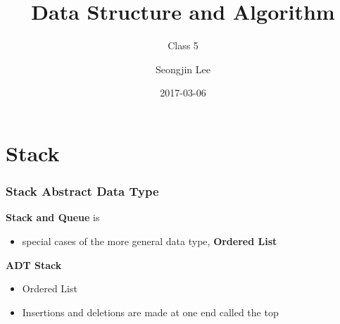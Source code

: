 \documentclass[newPxFont,sthlmFooter,nooffset]{beamer}
\title{Data Structure and Algorithm}
\subtitle{Class 5}
\author[SJL]{Seongjin Lee}
\institute{\href{mailto:insight@gnu.ac.kr}{insight@gnu.ac.kr}\\\url{http://resourceful.github.io}\\Systems Research Lab.\\GNU}
\date{2017-03-06}
\begin{document}
\frame[plain,t]{\titlepage} 



\section{Stack} 
\begin{frame}[t]
  \frametitle{Stack Abstract Data Type}
\textbf{Stack and Queue} is
\begin{itemize}
\item special cases of the more general data type, \textbf{Ordered List}
\end{itemize}

\textbf{ADT Stack}
\begin{itemize}
\item Ordered List
\item Insertions and deletions are made at one end called the top
\end{itemize}
\end{frame}
\end{document}
